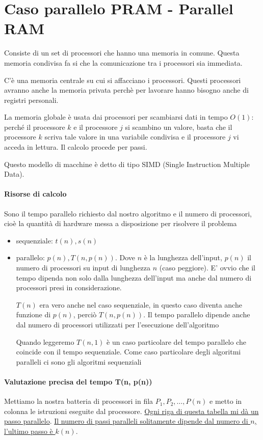 \section{Caso parallelo PRAM - Parallel RAM}
Consiste di un set di processori che hanno una memoria in comune. Questa memoria condivisa fa si che la comunicazione tra i processori sia immediata.

C'è una memoria centrale su cui si affacciano i processori. Questi processori avranno anche la memoria privata perchè per lavorare hanno bisogno anche di registri personali.

La memoria globale è usata dai processori per scambiarsi dati in tempo $O(1)$: perché il processore $k$ e il processore $j$ si scambino un valore, basta che il processore $k$ scriva tale valore in una variabile condivisa e il processore $j$ vi acceda in lettura. Il calcolo procede per passi.

Questo modello di macchine è detto di tipo SIMD (Single Instruction Multiple Data).

\paragraph{Risorse di calcolo} Sono il tempo parallelo richiesto dal nostro algoritmo e il numero di processori, cioè la quantità di hardware messa a disposizione per risolvere il problema
\begin{itemize}
    \item sequenziale: $t(n), s(n)$
    \item parallelo: $p(n), T(n,p(n))$. Dove $n$ è la lunghezza dell'input, $p(n)$ il numero di processori su input di lunghezza $n$ (caso peggiore). E' ovvio che il tempo dipenda non solo dalla lunghezza dell'input ma anche dal numero di processori presi in considerazione.

    $T(n)$ era vero anche nel caso sequenziale, in questo caso diventa anche funzione di $p(n)$, perciò $T(n, p(n))$. Il tempo parallelo dipende anche dal numero di processori utilizzati per l'esecuzione dell'algoritmo

    Quando leggeremo $T(n,1)$ è un caso particolare del tempo parallelo che coincide con il tempo sequenziale. Come caso particolare degli algoritmi paralleli ci sono gli algoritmi sequenziali
\end{itemize}

\paragraph{Valutazione precisa del tempo T(n, p(n))}
Mettiamo la nostra batteria di processori in fila $P_1, P_2, \dots, P(n)$ e metto in colonna le istruzioni eseguite dal processore. \uline{Ogni riga di questa tabella mi dà un passo parallelo}. \uline{Il numero di passi paralleli solitamente dipende dal numero di $n$, l'ultimo passo è $k(n)$}.

